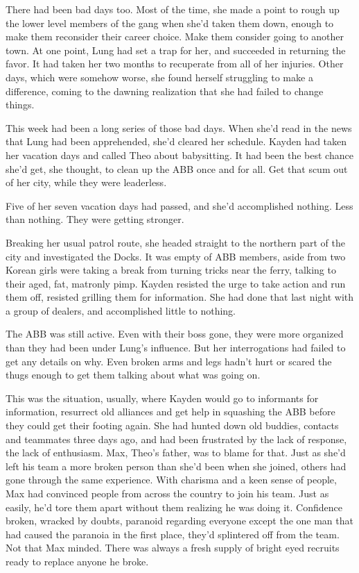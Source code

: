 There had been bad days too.  Most of the time, she made a point to rough up the lower level members of the gang when she'd taken them down, enough to make them reconsider their career choice.  Make them consider going to another town.  At one point, Lung had set a trap for her, and succeeded in returning the favor.  It had taken her two months to recuperate from all of her injuries.  Other days, which were somehow worse, she found herself struggling to make a difference, coming to the dawning realization that she had failed to change things.



This week had been a long series of those bad days.  When she'd read in the news that Lung had been apprehended, she'd cleared her schedule.  Kayden had taken her vacation days and called Theo about babysitting.  It had been the best chance she'd get, she thought, to clean up the ABB once and for all.  Get that scum out of her city, while they were leaderless.



Five of her seven vacation days had passed, and she'd accomplished nothing.  Less than nothing.  They were getting stronger.



Breaking her usual patrol route, she headed straight to the northern part of the city and investigated the Docks.  It was empty of ABB members, aside from two Korean girls were taking a break from turning tricks near the ferry, talking to their aged, fat, matronly pimp.   Kayden resisted the urge to take action and run them off, resisted grilling them for information.  She had done that last night with a group of dealers, and accomplished little to nothing.



The ABB was still active.  Even with their boss gone, they were more organized than they had been under Lung's influence.  But her interrogations had failed to get any details on why.  Even broken arms and legs hadn't hurt or scared the thugs enough to get them talking about what was going on.



This was the situation, usually, where Kayden would go to informants for information, resurrect old alliances and get help in squashing the ABB before they could get their footing again.  She had hunted down old buddies, contacts and teammates three days ago, and had been frustrated by the lack of response, the lack of enthusiasm.  Max, Theo's father, was to blame for that.  Just as she'd left his team a more broken person than she'd been when she joined, others had gone through the same experience. With charisma and a keen sense of people, Max had convinced people from across the country to join his team.  Just as easily, he'd tore them apart without them realizing he was doing it.  Confidence broken, wracked by doubts, paranoid regarding everyone except the one man that had caused the paranoia in the first place, they'd splintered off from the team.  Not that Max minded.  There was always a fresh supply of bright eyed recruits ready to replace anyone he broke.



